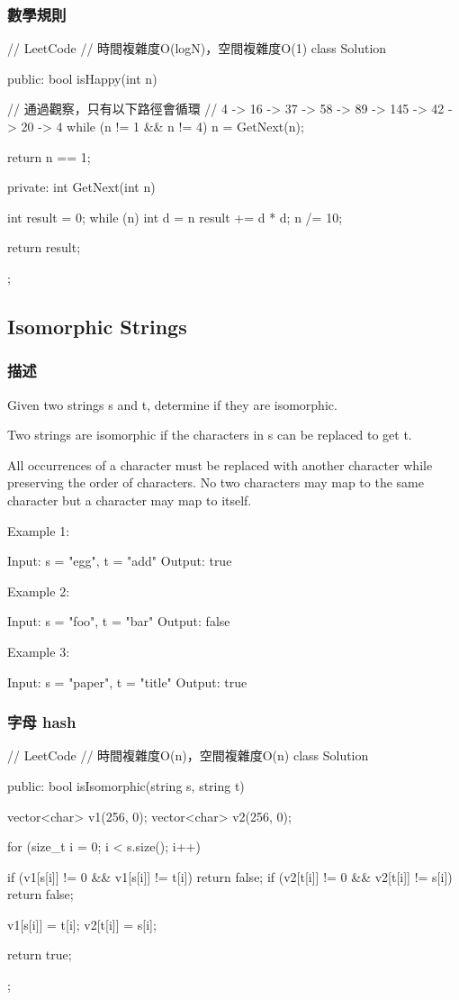 \subsubsection{數學規則}
\begin{Code}
// LeetCode
// 時間複雜度O(logN)，空間複雜度O(1)
class Solution {
public:
    bool isHappy(int n) {
        // 通過觀察，只有以下路徑會循環
        // 4 -> 16 -> 37 -> 58 -> 89 -> 145 -> 42 -> 20 -> 4
        while (n != 1 && n != 4)
            n = GetNext(n);

        return n == 1;
    }
private:
    int GetNext(int n)
    {
        int result = 0;
        while (n)
        {
            int d = n %
            result += d * d;
            n /= 10;
        }

        return result;
    }
};
\end{Code}

\subsection{Isomorphic Strings}
\label{sec:isomorphic-strings}

\subsubsection{描述}
Given two strings s and t, determine if they are isomorphic.

Two strings are isomorphic if the characters in s can be replaced to get t.

All occurrences of a character must be replaced with another character while preserving the order of characters. No two characters may map to the same character but a character may map to itself.

Example 1:
\begin{Code}
Input: s = "egg", t = "add"
Output: true
\end{Code}

Example 2:
\begin{Code}
Input: s = "foo", t = "bar"
Output: false
\end{Code}

Example 3:
\begin{Code}
Input: s = "paper", t = "title"
Output: true
\end{Code}

\subsubsection{字母 hash}
\begin{Code}
// LeetCode
// 時間複雜度O(n)，空間複雜度O(n)
class Solution {
public:
    bool isIsomorphic(string s, string t) {
        vector<char> v1(256, 0);
        vector<char> v2(256, 0);

        for (size_t i = 0; i < s.size(); i++)
        {
            if (v1[s[i]] != 0 && v1[s[i]] != t[i]) return false;
            if (v2[t[i]] != 0 && v2[t[i]] != s[i]) return false;

            v1[s[i]] = t[i];
            v2[t[i]] = s[i];
        }

        return true;
    }
};
\end{Code}
